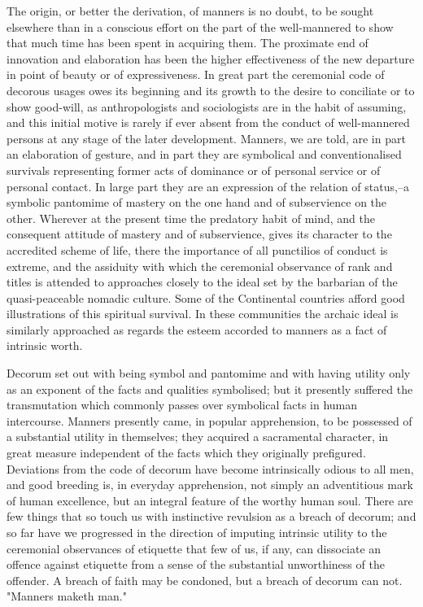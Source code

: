 \documentclass[12pt]{report}
\begin{document}
The origin, or better the derivation, of manners is no doubt, to
be sought elsewhere than in a conscious effort on the part of the
well-mannered to show that much time has been spent in acquiring them.
The proximate end of innovation and elaboration has been the
higher effectiveness of the new departure in point of beauty or of
expressiveness. In great part the ceremonial code of decorous usages
owes its beginning and its growth to the desire to conciliate or to
show good-will, as anthropologists and sociologists are in the habit
of assuming, and this initial motive is rarely if ever absent from the
conduct of well-mannered persons at any stage of the later development.
Manners, we are told, are in part an elaboration of gesture, and in part
they are symbolical and conventionalised survivals representing former
acts of dominance or of personal service or of personal contact. In
large part they are an expression of the relation of status,--a symbolic
pantomime of mastery on the one hand and of subservience on the other.
Wherever at the present time the predatory habit of mind, and the
consequent attitude of mastery and of subservience, gives its character
to the accredited scheme of life, there the importance of all punctilios
of conduct is extreme, and the assiduity with which the ceremonial
observance of rank and titles is attended to approaches closely to the
ideal set by the barbarian of the quasi-peaceable nomadic culture. Some
of the Continental countries afford good illustrations of this spiritual
survival. In these communities the archaic ideal is similarly approached
as regards the esteem accorded to manners as a fact of intrinsic worth.

Decorum set out with being symbol and pantomime and with having utility
only as an exponent of the facts and qualities symbolised; but it
presently suffered the transmutation which commonly passes over
symbolical facts in human intercourse. Manners presently came, in
popular apprehension, to be possessed of a substantial utility in
themselves; they acquired a sacramental character, in great measure
independent of the facts which they originally prefigured. Deviations
from the code of decorum have become intrinsically odious to all
men, and good breeding is, in everyday apprehension, not simply an
adventitious mark of human excellence, but an integral feature of
the worthy human soul. There are few things that so touch us with
instinctive revulsion as a breach of decorum; and so far have we
progressed in the direction of imputing intrinsic utility to the
ceremonial observances of etiquette that few of us, if any, can
dissociate an offence against etiquette from a sense of the substantial
unworthiness of the offender. A breach of faith may be condoned, but a
breach of decorum can not. "Manners maketh man."
\end{document}
